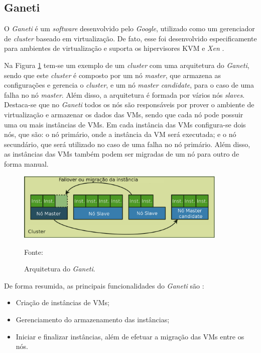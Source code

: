 \subsection{Ganeti}
\label{section:ganeti}
O \textit{Ganeti} \cite{ganeti} é um \textit{software} desenvolvido pelo \textit{Google}, utilizado como um gerenciador de \textit{cluster} 
baseado em virtualização. De fato, esse foi desenvolvido especificamente para ambientes de virtualização e suporta os hipervisores 
\ac{KVM} \cite{kvm} e \textit{Xen} \cite{xen}. 

\newpage
Na Figura \ref{fig:ganeti_arquitetura} tem-se um exemplo de um \textit{cluster} com uma arquitetura do \textit{Ganeti}, sendo que este 
\textit{cluster} é composto por um nó \textit{master}, que armazena as configurações e gerencia o \textit{cluster}, e um nó 
\textit{master candidate}, para o caso de uma falha no nó \textit{master}. Além disso, a arquitetura é formada por vários nós \textit{slaves}. 
Destaca-se que no \textit{Ganeti} todos os nós são responsáveis por prover o ambiente de virtualização e armazenar os dados das \acp{VM}, 
sendo que cada nó pode possuir uma ou mais instâncias de \acp{VM}. Em cada instância das \acp{VM} configura-se dois nós, que são: o nó primário, 
onde a instância da \ac{VM} será executada; e o nó secundário, que será utilizado no caso de uma falha no nó primário.
Além disso, as instâncias das \acp{VM} também podem ser migradas de um nó para outro de forma manual. 

\begin{figure}[h!]
 \centering
 \includegraphics[width=380px]{img/ganeti_arquitetura.eps}
 \caption{Arquitetura do \textit{Ganeti}.}
 Fonte: \citet{carvalho2011}
 \label{fig:ganeti_arquitetura}
\end{figure}

De forma resumida, as principais funcionalidades do \textit{Ganeti} são \cite{ganeti}:
\begin{itemize}
 \item Criação de instâncias de \acp{VM};
 \item Gerenciamento do armazenamento das instâncias;
 \item Iniciar e finalizar instâncias, além de efetuar a migração das \acp{VM} entre os nós.
\end{itemize}

